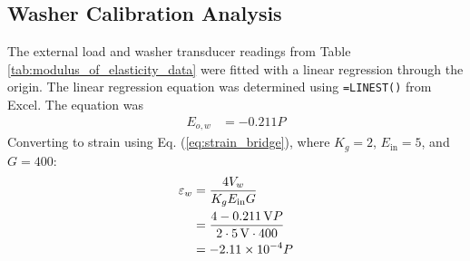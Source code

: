 \subsection{Washer Calibration Analysis}
The external load and washer transducer readings from Table \ref{tab:modulus_of_elasticity_data} were fitted with a linear regression through the origin. The linear regression equation was determined using \texttt{=LINEST()} from Excel. The equation was 
\begin{align*}
    E_{o, w} &= -0.211 P 
\end{align*}
Converting to strain using Eq. (\ref{eq:strain_bridge}), where $K_g = 2$, $E_{\text{in}} = 5$, and $G = 400$:
\begin{align*}
    \varepsilon_w &= \frac{4 V_{w}}{K_g E_{\text{in}} G} \\
    &= \frac{4 \qty{-0.211}{V}P}{2 \cdot \qty{5}{V} \cdot 400} \\
    &= \qty{-2.11E-04}{} P
\end{align*}


